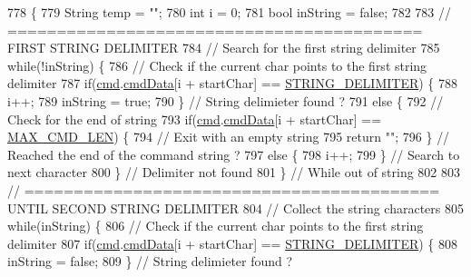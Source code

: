 \begin{DoxyCode}
778                                     \{
779   String temp = \textcolor{stringliteral}{""};
780   \textcolor{keywordtype}{int} i = 0;
781   \textcolor{keywordtype}{bool} inString = \textcolor{keyword}{false};
782   
783   \textcolor{comment}{// ========================================== FIRST STRING DELIMITER}
784   \textcolor{comment}{// Search for the first string delimiter}
785   \textcolor{keywordflow}{while}(!inString) \{
786     \textcolor{comment}{// Check if the current char points to the first string delimiter}
787     \textcolor{keywordflow}{if}(\hyperlink{_meditech___chip_kit_control_panel_8pde_a9ec7ba7a86dba057afdae246ca1ac40e}{cmd}.\hyperlink{structparse_command_a01d90da128793f2c09ce31ce4a9f2ce5}{cmdData}[i + startChar] == \hyperlink{_command_processor_8h_a0f64fd8fb7385169ef53c7d2d49b02cc}{STRING\_DELIMITER}) \{
788       i++;
789       inString = \textcolor{keyword}{true};
790     \} \textcolor{comment}{// String delimieter found ?}
791     \textcolor{keywordflow}{else} \{
792       \textcolor{comment}{// Check for the end of string}
793       \textcolor{keywordflow}{if}(\hyperlink{_meditech___chip_kit_control_panel_8pde_a9ec7ba7a86dba057afdae246ca1ac40e}{cmd}.\hyperlink{structparse_command_a01d90da128793f2c09ce31ce4a9f2ce5}{cmdData}[i + startChar] == \hyperlink{_command_processor_8h_a1eb73c104b484cf18752169509cebfe2}{MAX\_CMD\_LEN}) \{
794         \textcolor{comment}{// Exit with an empty string}
795         \textcolor{keywordflow}{return} \textcolor{stringliteral}{""};
796       \} \textcolor{comment}{// Reached the end of the command string ?}
797       \textcolor{keywordflow}{else} \{
798         i++;
799       \} \textcolor{comment}{// Search to next character}
800     \} \textcolor{comment}{// Delimiter not found}
801   \} \textcolor{comment}{// While out of string}
802 
803   \textcolor{comment}{// ========================================== UNTIL SECOND STRING DELIMITER}
804   \textcolor{comment}{// Collect the string characters}
805   \textcolor{keywordflow}{while}(inString) \{
806     \textcolor{comment}{// Check if the current char points to the first string delimiter}
807     \textcolor{keywordflow}{if}(\hyperlink{_meditech___chip_kit_control_panel_8pde_a9ec7ba7a86dba057afdae246ca1ac40e}{cmd}.\hyperlink{structparse_command_a01d90da128793f2c09ce31ce4a9f2ce5}{cmdData}[i + startChar] == \hyperlink{_command_processor_8h_a0f64fd8fb7385169ef53c7d2d49b02cc}{STRING\_DELIMITER}) \{
808       inString = \textcolor{keyword}{false};
809     \} \textcolor{comment}{// String delimieter found ?}

\end{DoxyCode}
